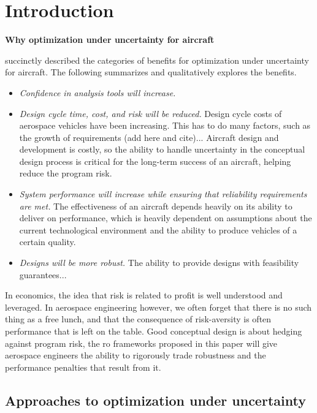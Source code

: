 \section{Introduction}

\textbf{Why optimization under uncertainty for aircraft}


\cite{Zang2002} succinctly described the categories of benefits for optimization under uncertainty for aircraft.
The following summarizes and qualitatively explores the benefits.
\begin{itemize}
    \item \textit{Confidence in analysis tools will increase.}
    \item \textit{Design cycle time, cost, and risk will be reduced.}
    Design cycle costs of aerospace vehicles have been increasing. This has to do
    many factors, such as the growth of requirements (add here and cite)...
    Aircraft design and development is costly, so the ability to handle uncertainty in
    the conceptual design process is critical for the long-term success of an aircraft,
    helping reduce the program risk.
    \item \textit{System performance will increase while ensuring that reliability requirements
                  are met. }
    The effectiveness of an aircraft depends heavily on its
    ability to deliver on performance, which is heavily dependent on assumptions about the
    current technological environment and the ability to produce vehicles of a certain quality.
    \item \textit{Designs will be more robust.}
    The ability to provide designs with feasibility guarantees...
\end{itemize}

In economics, the idea that risk is related to profit is well understood and leveraged.
In aerospace engineering however, we often forget that there is no such thing as a free lunch,
and that the consequence of risk-aversity is often performance that is left on the table.
Good conceptual design is about hedging against program risk,
the \gls{ro} frameworks proposed in this paper will
give aerospace engineers the ability to rigorously trade robustness and the performance penalties
that result from it.

\subsection{Approaches to optimization under uncertainty}

